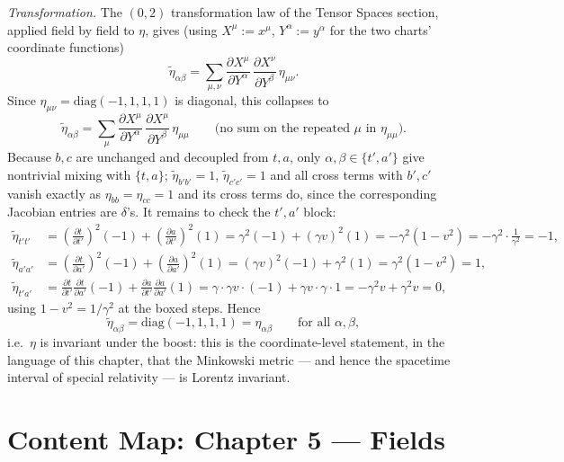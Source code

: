 \documentclass[11pt]{article}
\begin{document}
\emph{Transformation.} The $(0,2)$ transformation law of the Tensor Spaces
section, applied field by field to $\eta$, gives (using
$X^\mu:=x^\mu$, $Y^\alpha:=y^\alpha$ for the two charts' coordinate
functions)
\[
\widetilde\eta_{\alpha\beta} = \sum_{\mu,\nu}\frac{\partial X^\mu}{\partial Y^\alpha}\,\frac{\partial X^\nu}{\partial Y^\beta}\,\eta_{\mu\nu}.
\]
Since $\eta_{\mu\nu}=\mathrm{diag}(-1,1,1,1)$ is diagonal, this collapses
to
\[
\widetilde\eta_{\alpha\beta} = \sum_\mu\frac{\partial X^\mu}{\partial Y^\alpha}\,\frac{\partial X^\mu}{\partial Y^\beta}\,\eta_{\mu\mu}\qquad\text{(no sum on the repeated }\mu\text{ in }\eta_{\mu\mu}\text{)}.
\]
Because $b,c$ are unchanged and decoupled from $t,a$, only $\alpha,\beta
\in\{t',a'\}$ give nontrivial mixing with $\{t,a\}$; $\widetilde
\eta_{b'b'}=1$, $\widetilde\eta_{c'c'}=1$ and all cross terms with $b',c'$
vanish exactly as $\eta_{bb}=\eta_{cc}=1$ and its cross terms do, since the
corresponding Jacobian entries are $\delta$'s. It remains to check the
$t',a'$ block:
\begin{align*}
\widetilde\eta_{t't'} &= \left(\frac{\partial t}{\partial t'}\right)^2(-1) + \left(\frac{\partial a}{\partial t'}\right)^2(1) = \gamma^2(-1)+(\gamma v)^2(1) = -\gamma^2(1-v^2) = -\gamma^2\cdot\frac{1}{\gamma^2} = -1, \\
\widetilde\eta_{a'a'} &= \left(\frac{\partial t}{\partial a'}\right)^2(-1) + \left(\frac{\partial a}{\partial a'}\right)^2(1) = (\gamma v)^2(-1)+\gamma^2(1) = \gamma^2(1-v^2) = 1, \\
\widetilde\eta_{t'a'} &= \frac{\partial t}{\partial t'}\frac{\partial t}{\partial a'}(-1) + \frac{\partial a}{\partial t'}\frac{\partial a}{\partial a'}(1) = \gamma\cdot\gamma v\cdot(-1) + \gamma v\cdot\gamma\cdot1 = -\gamma^2v+\gamma^2v = 0,
\end{align*}
using $1-v^2=1/\gamma^2$ at the boxed steps. Hence
\[
\widetilde\eta_{\alpha\beta} = \mathrm{diag}(-1,1,1,1) = \eta_{\alpha\beta}\qquad\text{for all }\alpha,\beta,
\]
i.e.\ $\eta$ is invariant under the boost: this is the coordinate-level
statement, in the language of this chapter, that the Minkowski metric —
and hence the spacetime interval of special relativity — is Lorentz
invariant.


\clearpage
\section*{Content Map: Chapter 5 --- Fields}
\end{document}
